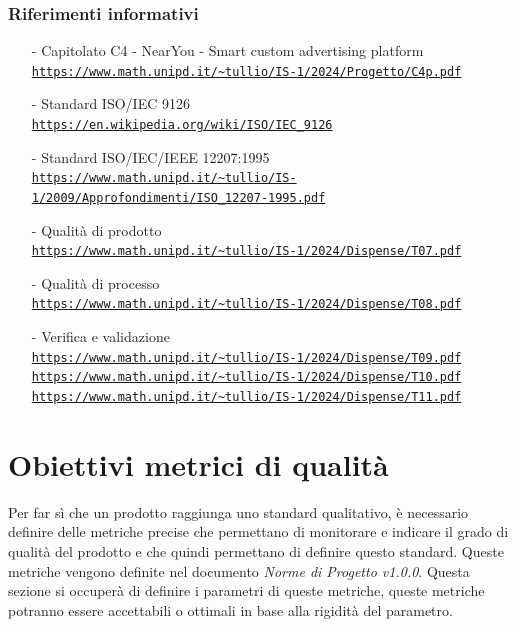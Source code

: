 \documentclass[10pt]{article}
\begin{document}
\begin{justify}
\begin{itemize}
\end{itemize}
\subsubsection{Riferimenti informativi}
\begin{itemize}
    \item[-] Capitolato C4 - NearYou -
Smart custom advertising platform\\
    \textcolor{blue}{\texttt{\url{https://www.math.unipd.it/~tullio/IS-1/2024/Progetto/C4p.pdf}}}
    \item[-] Standard ISO/IEC 9126 \label{ISO 9126} \\
    \textcolor{blue}{\texttt{\url{https://en.wikipedia.org/wiki/ISO/IEC_9126}}}
    \item[-] Standard ISO/IEC/IEEE 12207:1995 \label{ISO 12207:1995}\\
    \textcolor{blue}{\texttt{\url{https://www.math.unipd.it/~tullio/IS-1/2009/Approfondimenti/ISO_12207-1995.pdf}}}
    \item[-] Qualità di prodotto\\
    \textcolor{blue}{\texttt{\url{https://www.math.unipd.it/~tullio/IS-1/2024/Dispense/T07.pdf}}}
    \item[-] Qualità di processo\\
    \textcolor{blue}{\texttt{\url{https://www.math.unipd.it/~tullio/IS-1/2024/Dispense/T08.pdf}}}
    \item[-] Verifica e validazione\\
    \textcolor{blue}{\texttt{\url{https://www.math.unipd.it/~tullio/IS-1/2024/Dispense/T09.pdf}}}\\
    \textcolor{blue}{\texttt{\url{https://www.math.unipd.it/~tullio/IS-1/2024/Dispense/T10.pdf}}}\\
    \textcolor{blue}{\texttt{\url{https://www.math.unipd.it/~tullio/IS-1/2024/Dispense/T11.pdf}}}
\end{itemize}
\newpage

\section{Obiettivi metrici di qualità}
Per far sì che un prodotto raggiunga uno standard qualitativo, è necessario definire delle metriche precise che permettano di monitorare e indicare il grado di qualità del prodotto e che quindi permettano di definire questo standard.
Queste metriche vengono definite nel documento \textit{Norme di Progetto v1.0.0}.
Questa sezione si occuperà di definire i parametri di queste metriche, queste metriche potranno essere accettabili o ottimali in base alla rigidità del parametro.\\


\end{justify}
\end{document}
